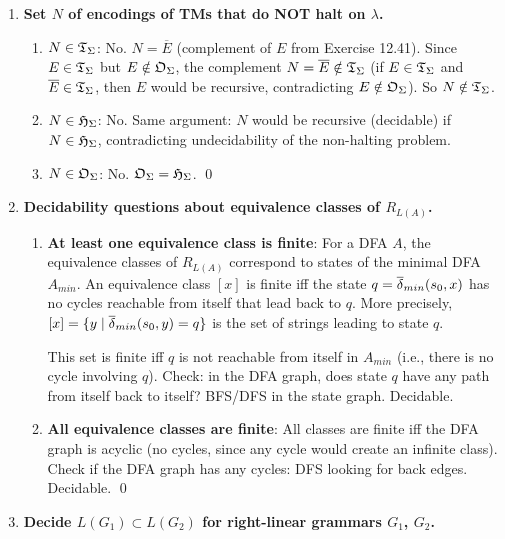 \begin{enumerate}[{12.}1. ]
\item \textbf{Set $N$ of encodings of TMs that do NOT halt on $\lambda$.}

\begin{enumerate}
\item \textbf{$N\in\mathfrak{T}_\Sigma$}: No. $N = \overline{E}$ (complement of $E$ from Exercise 12.41). Since $E\in\mathfrak{T}_\Sigma$ but $E\notin\mathfrak{O}_\Sigma$, the complement $N = \overline{E}\notin\mathfrak{T}_\Sigma$ (if $E\in\mathfrak{T}_\Sigma$ and $\overline{E}\in\mathfrak{T}_\Sigma$, then $E$ would be recursive, contradicting $E\notin\mathfrak{O}_\Sigma$). So $N\notin\mathfrak{T}_\Sigma$.

\item \textbf{$N\in\mathfrak{H}_\Sigma$}: No. Same argument: $N$ would be recursive (decidable) if $N\in\mathfrak{H}_\Sigma$, contradicting undecidability of the non-halting problem.

\item \textbf{$N\in\mathfrak{O}_\Sigma$}: No. $\mathfrak{O}_\Sigma = \mathfrak{H}_\Sigma$. \qed
\end{enumerate}

\item \textbf{Decidability questions about equivalence classes of $R_{L(A)}$.}

\begin{enumerate}
\item \textbf{At least one equivalence class is finite}: For a DFA $A$, the equivalence classes of $R_{L(A)}$ correspond to states of the minimal DFA $A_{min}$. An equivalence class $[x]$ is finite iff the state $q = \overline{\delta}_{min}(s_0,x)$ has no cycles reachable from itself that lead back to $q$. More precisely, $[x] = \{y\mid\overline{\delta}_{min}(s_0,y)=q\}$ is the set of strings leading to state $q$.

This set is finite iff $q$ is not reachable from itself in $A_{min}$ (i.e., there is no cycle involving $q$). Check: in the DFA graph, does state $q$ have any path from itself back to itself? BFS/DFS in the state graph. Decidable.

\item \textbf{All equivalence classes are finite}: All classes are finite iff the DFA graph is acyclic (no cycles, since any cycle would create an infinite class). Check if the DFA graph has any cycles: DFS looking for back edges. Decidable. \qed
\end{enumerate}

\item \textbf{Decide $L(G_1)\subset L(G_2)$ for right-linear grammars $G_1$, $G_2$.}


\end{enumerate}
